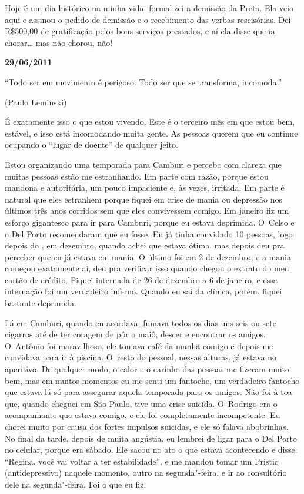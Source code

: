 Hoje é um dia histórico na minha vida: formalizei a demissão da Preta.
Ela veio aqui e assinou o pedido de demissão e o recebimento das verbas
rescisórias. Dei R\$500,00 de gratificação pelos bons serviços
prestados, e aí ela disse que ia chorar… mas não chorou, não!

\begin{center}\asterisc{}\end{center}

\begin{flushright}\textbf{29/06/2011}\end{flushright}

\epigraph{``Todo ser em movimento é perigoso. Todo ser que se transforma,
incomoda.''}{(Paulo Leminski)} 

É exatamente isso o que estou vivendo. Este é o terceiro mês em que
estou bem, estável, e isso está incomodando muita gente. As pessoas
querem que eu continue ocupando o ``lugar de doente'' de qualquer jeito.

Estou organizando uma temporada para Camburi e percebo com clareza que
muitas pessoas estão me estranhando. Em parte com razão, porque estou
mandona e autoritária, um pouco impaciente e, às vezes, irritada. Em
parte é natural que eles estranhem porque fiquei em crise de mania ou
depressão nos últimos três anos corridos sem que eles convivessem
comigo. Em janeiro fiz um esforço gigantesco para ir para Camburi,
porque eu estava deprimida. O~Celso e o Del Porto recomendaram que eu
fosse. Eu já tinha convidado 10 pessoas, logo depois do , em
dezembro, quando achei que estava ótima, mas depois deu pra perceber que
eu já estava em mania. O último  foi em 2 de dezembro, e a mania
começou exatamente aí, deu pra verificar isso quando chegou o extrato do
meu cartão de crédito. Fiquei internada de 26 de dezembro a 6 de
janeiro, e essa internação foi um verdadeiro inferno. Quando eu saí da
clínica, porém, fiquei bastante deprimida.

Lá em Camburi, quando eu acordava, fumava todos os dias uns seis ou sete
cigarros até de ter coragem de pôr o maiô, descer e encontrar os amigos.
O~Antônio foi maravilhoso, ele tomava café da manhã comigo e depois me
convidava para ir à piscina. O~resto do pessoal, nessas alturas, já
estava no aperitivo. De qualquer modo, o calor e o carinho das pessoas
me fizeram muito bem, mas em muitos momentos eu me senti um fantoche, um
verdadeiro fantoche que estava lá só para assegurar aquela temporada
para os amigos. Não foi à toa que, quando cheguei em São Paulo, tive uma
crise suicida. O~Rodrigo era o acompanhante que estava comigo, e ele foi
completamente incompetente. Eu chorei muito por causa dos fortes
impulsos suicidas, e ele só falava abobrinhas. No final da tarde, depois
de muita angústia, eu lembrei de ligar para o Del Porto no celular,
porque era sábado. Ele sacou no ato o que estava acontecendo e disse:
``Regina, você vai voltar a ter estabilidade'', e me mandou tomar um
Pristiq (antidepressivo) naquele momento, outro na segunda"-feira, e ir
ao consultório dele na segunda"-feira. Foi o que eu fiz.


